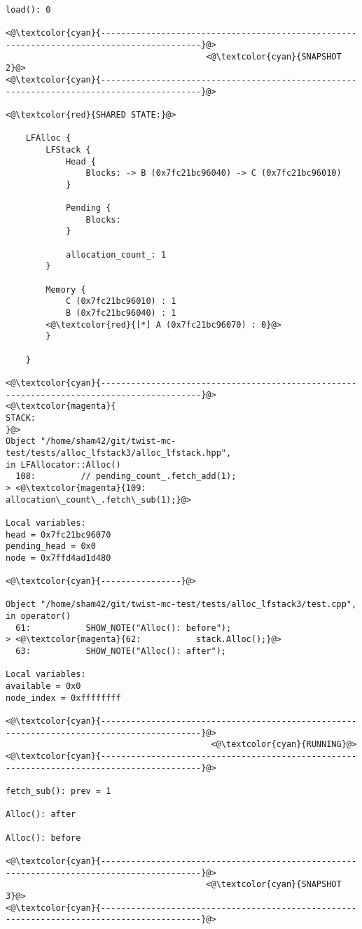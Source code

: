 \begin{adjustwidth}{-3.3cm}{-1cm}
\begin{allintypewriter}
\begin{multicols*}{2}
\begin{lstlisting}[numbers=none]
load(): 0

<@\textcolor{cyan}{------------------------------------------------------------------------------------------}@>
                                        <@\textcolor{cyan}{SNAPSHOT 2}@>
<@\textcolor{cyan}{------------------------------------------------------------------------------------------}@>

<@\textcolor{red}{SHARED STATE:}@>

    LFAlloc {
	    LFStack {
		    Head {
			    Blocks: -> B (0x7fc21bc96040) -> C (0x7fc21bc96010) 
		    }

		    Pending {
			    Blocks: 
		    }

		    allocation_count_: 1
	    }

	    Memory {
		    C (0x7fc21bc96010) : 1
		    B (0x7fc21bc96040) : 1
		<@\textcolor{red}{[*] A (0x7fc21bc96070) : 0}@>
	    }

    }

<@\textcolor{cyan}{------------------------------------------------------------------------------------------}@>
<@\textcolor{magenta}{
STACK:
}@>
Object "/home/sham42/git/twist-mc-test/tests/alloc_lfstack3/alloc_lfstack.hpp",
in LFAllocator::Alloc()
  108:         // pending_count_.fetch_add(1);
> <@\textcolor{magenta}{109:         allocation\_count\_.fetch\_sub(1);}@>

Local variables: 
head = 0x7fc21bc96070
pending_head = 0x0
node = 0x7ffd4ad1d480

<@\textcolor{cyan}{----------------}@>

Object "/home/sham42/git/twist-mc-test/tests/alloc_lfstack3/test.cpp",
in operator()
  61:           SHOW_NOTE("Alloc(): before");
> <@\textcolor{magenta}{62:           stack.Alloc();}@>
  63:           SHOW_NOTE("Alloc(): after");

Local variables: 
available = 0x0
node_index = 0xffffffff

<@\textcolor{cyan}{------------------------------------------------------------------------------------------}@>
                                         <@\textcolor{cyan}{RUNNING}@>
<@\textcolor{cyan}{------------------------------------------------------------------------------------------}@>

fetch_sub(): prev = 1

Alloc(): after

Alloc(): before

<@\textcolor{cyan}{------------------------------------------------------------------------------------------}@>
                                        <@\textcolor{cyan}{SNAPSHOT 3}@>
<@\textcolor{cyan}{------------------------------------------------------------------------------------------}@>


\end{lstlisting}
\end{multicols*}
\end{allintypewriter}
\end{adjustwidth}
